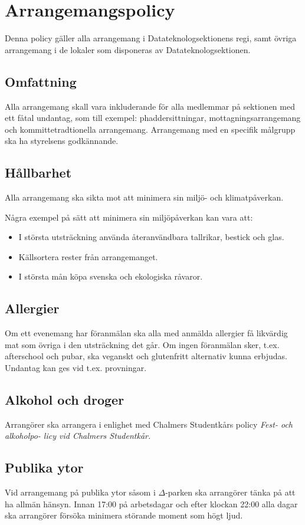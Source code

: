 \section{Arrangemangspolicy}
Denna policy gäller alla arrangemang i Datateknologsektionens regi, samt övriga arrangemang i de lokaler som disponeras av Datateknologsektionen.

\subsection{Omfattning}
Alla arrangemang skall vara inkluderande för alla medlemmar på sektionen med ett fåtal undantag, som till exempel: phaddersittningar, mottagningsarrangemang och kommittetradtionella arrangemang. Arrangemang med en specifik målgrupp ska ha styrelsens godkännande.

\subsection{Hållbarhet}
Alla arrangemang ska sikta mot att minimera sin miljö- och klimatpåverkan.

Några exempel på sätt att minimera sin miljöpåverkan kan vara att:
\begin{itemize}
    \item I största utsträckning använda återanvändbara tallrikar, bestick och glas.
    \item Källsortera rester från arrangemanget.
    \item I största mån köpa svenska och ekologiska råvaror.
\end{itemize}

\subsection{Allergier}
Om ett evenemang har föranmälan ska alla med anmälda allergier få likvärdig mat som övriga i den utsträckning det går. Om ingen föranmälan sker, t.ex. afterschool och pubar, ska veganskt och glutenfritt alternativ kunna erbjudas. Undantag kan ges vid t.ex. provningar.

\subsection{Alkohol och droger}
Arrangörer ska arrangera i enlighet med Chalmers Studentkårs policy \textit{Fest- och alkoholpo-
licy vid Chalmers Studentkår.}

\subsection{Publika ytor}
Vid arrangemang på publika ytor såsom i $\Delta$-parken ska arrangörer tänka på
att ha allmän hänsyn. Innan 17:00 på arbetsdagar och efter klockan 22:00 alla dagar ska
arrangörer försöka minimera störande moment som högt ljud.